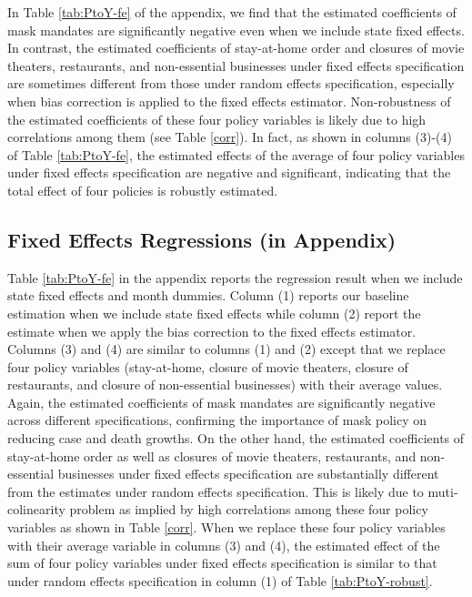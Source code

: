 \documentclass[11pt,reqno,letter]{amsart}
\theoremstyle{definition}
\begin{document}
In Table \ref{tab:PtoY-fe} of the appendix,   we find that the estimated coefficients of mask mandates are significantly negative even when we include state fixed effects. In contrast,  the estimated coefficients of stay-at-home order  and closures of movie theaters, restaurants, and non-essential businesses under fixed effects specification are sometimes different from those under random effects specification, especially when bias correction is applied to the fixed effects estimator.  Non-robustness of the estimated coefficients of these four  policy variables 
 is likely due to high correlations among them (see Table \ref{corr}). In fact, as shown in columns (3)-(4) of Table \ref{tab:PtoY-fe}, the  estimated effects of the average of four policy variables 
 under fixed effects specification are negative and significant, indicating that  the total effect of four policies is robustly estimated.



\subsection{Fixed Effects Regressions (in Appendix)}

Table \ref{tab:PtoY-fe} in the appendix reports the regression result when we include state fixed effects and month dummies. Column (1) reports our baseline estimation when we include state fixed effects while column (2) report the estimate when we apply the bias correction to the fixed effects estimator. Columns (3) and (4) are similar to columns (1) and (2) except that we replace  four policy variables  (stay-at-home, closure of movie theaters, closure of restaurants, and closure of non-essential businesses) with their average values.  Again, the estimated coefficients of mask mandates are significantly negative across different specifications, confirming the importance of mask policy on reducing case and death growths. On the other hand,  the estimated coefficients of stay-at-home order as well as closures of movie theaters, restaurants, and non-essential businesses under fixed effects specification are substantially different from the estimates under random effects specification. This is likely due to muti-colinearity problem as implied by  high correlations among these four policy variables as shown in Table \ref{corr}. When we replace these four policy variables with their average variable in columns (3) and (4), the estimated effect of the sum of four policy variables under fixed effects specification is similar to that under random effects specification in column (1) of Table \ref{tab:PtoY-robust}. 
\end{document}
